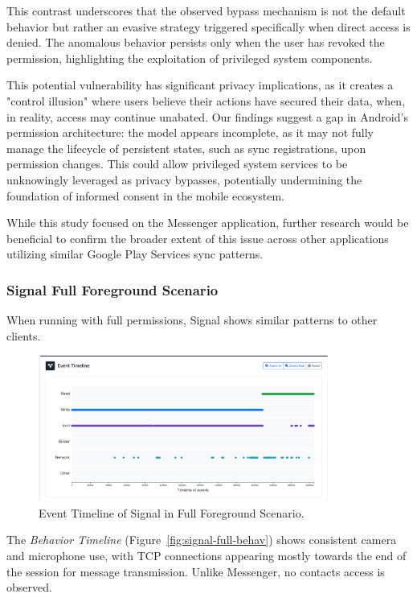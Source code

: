 \documentclass[a4paper,12pt]{report}
\begin{document}
This contrast underscores that the observed bypass mechanism is not the default behavior but rather an evasive strategy triggered specifically when direct access is denied. The anomalous behavior persists only when the user has revoked the permission, highlighting the exploitation of privileged system components.

This potential vulnerability has significant privacy implications, as it creates a "control illusion" where users believe their actions have secured their data, when, in reality, access may continue unabated. Our findings suggest a gap in Android's permission architecture: the model appears incomplete, as it may not fully manage the lifecycle of persistent states, such as sync registrations, upon permission changes. This could allow privileged system services to be unknowingly leveraged as privacy bypasses, potentially undermining the foundation of informed consent in the mobile ecosystem.

While this study focused on the Messenger application, further research would be beneficial to confirm the broader extent of this issue across other applications utilizing similar Google Play Services sync patterns.

\subsubsection{Signal Full Foreground Scenario}

When running with full permissions, Signal shows similar patterns to other clients.

\begin{figure}[H]
    \centering
    \includegraphics[width=0.85\textwidth]{signal-full-events.png}
    \caption{Event Timeline of Signal in Full Foreground Scenario.}
    \label{fig:signal-full-events}
\end{figure}

The \textit{Behavior Timeline} (Figure~\ref{fig:signal-full-behav}) shows consistent camera and microphone use, with TCP connections appearing mostly towards the end of the session for message transmission. Unlike Messenger, no contacts access is observed.
\end{document}
